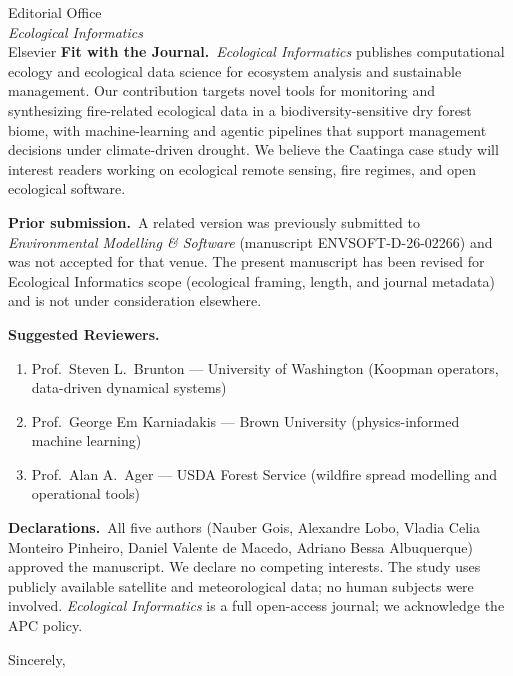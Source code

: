 \documentclass[a4paper,12pt]{letter}
\begin{document}
\begin{letter}{%
  Editorial Office\\
  \textit{Ecological Informatics}\\
  Elsevier
}
\medskip
\textbf{Fit with the Journal.}\
\textit{Ecological Informatics} publishes computational ecology and ecological data science for ecosystem analysis and sustainable management. Our contribution targets novel tools for monitoring and synthesizing fire-related ecological data in a biodiversity-sensitive dry forest biome, with machine-learning and agentic pipelines that support management decisions under climate-driven drought. We believe the Caatinga case study will interest readers working on ecological remote sensing, fire regimes, and open ecological software.

\medskip
\textbf{Prior submission.}\
A related version was previously submitted to \textit{Environmental Modelling \& Software} (manuscript ENVSOFT-D-26-02266) and was not accepted for that venue. The present manuscript has been revised for Ecological Informatics scope (ecological framing, length, and journal metadata) and is not under consideration elsewhere.

\medskip
\textbf{Suggested Reviewers.}
\begin{enumerate}
  \item Prof.\ Steven L.\ Brunton --- University of Washington (Koopman operators, data-driven dynamical systems)
  \item Prof.\ George Em Karniadakis --- Brown University (physics-informed machine learning)
  \item Prof.\ Alan A.\ Ager --- USDA Forest Service (wildfire spread modelling and operational tools)
\end{enumerate}

\medskip
\textbf{Declarations.}\
All five authors (Nauber Gois, Alexandre Lobo, Vladia Celia Monteiro Pinheiro, Daniel Valente de Macedo, Adriano Bessa Albuquerque) approved the manuscript. We declare no competing interests. The study uses publicly available satellite and meteorological data; no human subjects were involved. \textit{Ecological Informatics} is a full open-access journal; we acknowledge the APC policy.

\closing{Sincerely,}

\end{letter}
\end{document}
